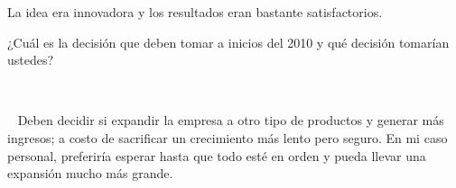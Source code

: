 \begin{sol}
	La idea era innovadora y los resultados eran bastante satisfactorios. 
\end{sol}
\begin{problema}
	¿Cuál es la decisión que deben tomar a inicios del 2010 y qué decisión tomarían ustedes?
\end{problema}
 \begin{sol}
 	Deben decidir si expandir la empresa a otro tipo de productos y generar más ingresos; a costo de sacrificar un crecimiento más lento pero seguro. En mi caso personal, preferiría esperar hasta que todo esté en orden y pueda llevar una expansión mucho más grande. 
 \end{sol}


%
%

